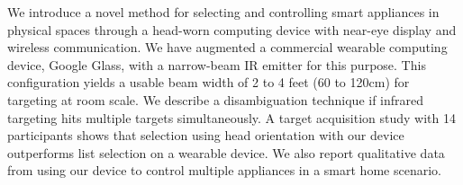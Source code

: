 We introduce a novel method for selecting and controlling smart appliances in physical spaces through a head-worn computing device with near-eye display and wireless communication. We have augmented a commercial wearable computing device, Google Glass, with a narrow-beam IR emitter for this purpose. This configuration yields a usable beam width of 2 to 4 feet (60 to 120cm) for targeting at room scale. We  describe a disambiguation technique if infrared targeting hits multiple targets simultaneously. A target acquisition study with 14 participants shows that selection using head orientation with our device outperforms list selection on a wearable device. We also report qualitative data from using our device to control multiple appliances in a smart home scenario.